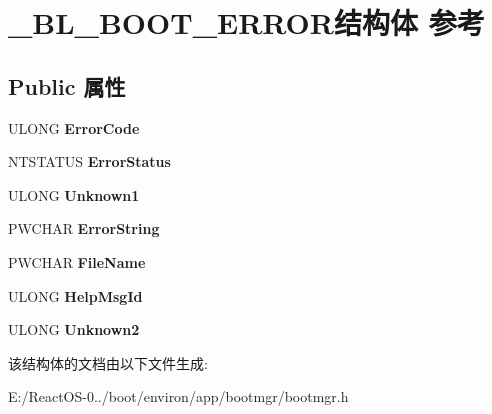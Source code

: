 \hypertarget{struct___b_l___b_o_o_t___e_r_r_o_r}{}\section{\+\_\+\+B\+L\+\_\+\+B\+O\+O\+T\+\_\+\+E\+R\+R\+O\+R结构体 参考}
\label{struct___b_l___b_o_o_t___e_r_r_o_r}
\subsection*{Public 属性}
\begin{DoxyCompactItemize}
\item 
\mbox{\label{struct___b_l___b_o_o_t___e_r_r_o_r_a661c3bf485a296b424579d938b625b69}} 
U\+L\+O\+NG {\bfseries Error\+Code}
\item 
\mbox{\label{struct___b_l___b_o_o_t___e_r_r_o_r_a5f53e5394029cbcf8676c8fead55c270}} 
N\+T\+S\+T\+A\+T\+US {\bfseries Error\+Status}
\item 
\mbox{\label{struct___b_l___b_o_o_t___e_r_r_o_r_a0d4378990dcfbbb785e936857e4ccd77}} 
U\+L\+O\+NG {\bfseries Unknown1}
\item 
\mbox{\label{struct___b_l___b_o_o_t___e_r_r_o_r_ac0812027905c10c411ccea7ca75d2605}} 
P\+W\+C\+H\+AR {\bfseries Error\+String}
\item 
\mbox{\label{struct___b_l___b_o_o_t___e_r_r_o_r_aced3a19f6bca7ba6599a7fb87e6138c8}} 
P\+W\+C\+H\+AR {\bfseries File\+Name}
\item 
\mbox{\label{struct___b_l___b_o_o_t___e_r_r_o_r_a054fbf37a3239a7c5820d2ff1712aa19}} 
U\+L\+O\+NG {\bfseries Help\+Msg\+Id}
\item 
\mbox{\label{struct___b_l___b_o_o_t___e_r_r_o_r_a7bec36e2715e96911c78da469fdf70c6}} 
U\+L\+O\+NG {\bfseries Unknown2}
\end{DoxyCompactItemize}


该结构体的文档由以下文件生成\+:\begin{DoxyCompactItemize}
\item 
E\+:/\+React\+O\+S-\/0../boot/environ/app/bootmgr/bootmgr.\+h\end{DoxyCompactItemize}
